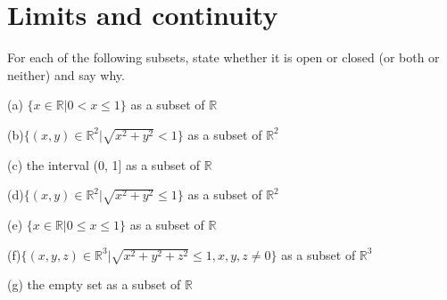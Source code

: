 \section{Limits and continuity}

\begin{exercise}{1}
    For each of the following subsets, state whether it is open or closed (or both or neither) and say why.

    (a) $\{x \in \mathbb{R} \lvert 0 < x \leq 1\}$ as a subset of $\mathbb{R}$

    (b)$\{(x, y) \in \mathbb{R}^2\lvert \sqrt{x^2+y^2} < 1\}$ as a subset of $\mathbb{R}^2$

    (c) the interval (0, 1] as a subset of $\mathbb{R}$

    (d)$\{(x, y) \in \mathbb{R}^2 \lvert \sqrt{x^2+y^2} \leq 1\}$ as a subset of $\mathbb{R}^2$

    (e) $\{x \in \mathbb{R} \lvert 0 \leq x \leq 1\}$ as a subset of $\mathbb{R}$

    (f)$\{(x, y, z) \in \mathbb{R}^3\lvert \sqrt{x^2+y^2+z^2} \leq 1, x, y, z \neq 0\}$ as a subset of $\mathbb{R}^3$

    (g) the empty set as a subset of $\mathbb{R}$
\end{exercise}

